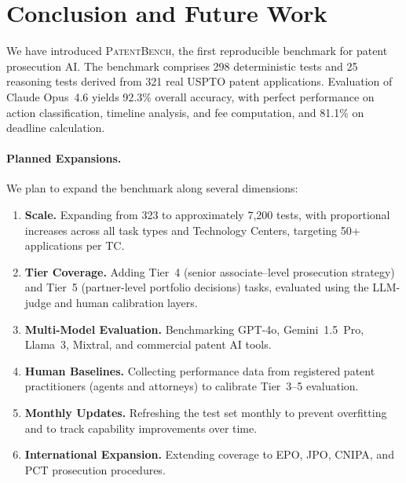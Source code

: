 \documentclass[11pt]{article}
\begin{document}
\section{Conclusion and Future Work}
\label{sec:conclusion}

We have introduced \textsc{PatentBench}, the first reproducible benchmark for patent prosecution AI. The benchmark comprises 298 deterministic tests and 25 reasoning tests derived from 321 real USPTO patent applications. Evaluation of Claude Opus~4.6 yields 92.3\% overall accuracy, with perfect performance on action classification, timeline analysis, and fee computation, and 81.1\% on deadline calculation.

\paragraph{Planned Expansions.}
We plan to expand the benchmark along several dimensions:

\begin{enumerate}[leftmargin=*]
    \item \textbf{Scale.} Expanding from 323 to approximately 7,200 tests, with proportional increases across all task types and Technology Centers, targeting 50+ applications per TC.

    \item \textbf{Tier Coverage.} Adding Tier~4 (senior associate--level prosecution strategy) and Tier~5 (partner-level portfolio decisions) tasks, evaluated using the LLM-judge and human calibration layers.

    \item \textbf{Multi-Model Evaluation.} Benchmarking GPT-4o, Gemini~1.5~Pro, Llama~3, Mixtral, and commercial patent AI tools.

    \item \textbf{Human Baselines.} Collecting performance data from registered patent practitioners (agents and attorneys) to calibrate Tier~3--5 evaluation.

    \item \textbf{Monthly Updates.} Refreshing the test set monthly to prevent overfitting and to track capability improvements over time.

    \item \textbf{International Expansion.} Extending coverage to EPO, JPO, CNIPA, and PCT prosecution procedures.
\end{enumerate}
\end{document}
